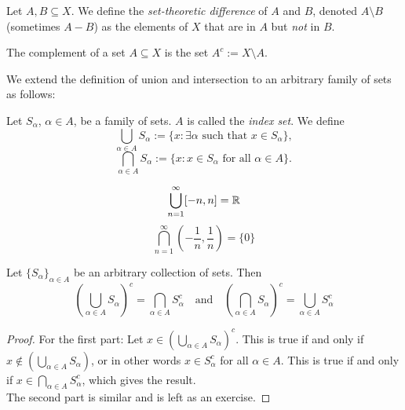 \documentclass{article}
\begin{document}
\begin{definition}
Let $A,B \subseteq X$. We define the \emph{set-theoretic difference} of $A$ and $B$, denoted $A \setminus B$ (sometimes $A-B$) as the elements of $X$ that are in $A$ but \emph{not} in $B$. 

The complement of a set $A \subseteq X$ is the set $A^c := X \setminus A$.
\end{definition}

We extend the definition of union and intersection to an arbitrary family of sets as follows:

\begin{definition}
Let $S_\alpha$, $\alpha \in A$, be a family of sets. $A$ is called the \emph{index set}. We define
\begin{equation*}
    \bigcup_{\alpha \in A} S_\alpha := \{ x: \exists \alpha \text{ such that } x \in S_\alpha \},
\end{equation*}
\begin{equation*}
    \bigcap_{\alpha \in A} S_\alpha := \{ x: x \in S_\alpha \text{ for all } \alpha \in A \}.
\end{equation*}
\end{definition}

\begin{example}
$$\bigcup_{n=1}^\infty [-n,n] = {\mathbb{R}}$$
$$\bigcap_{n=1}^\infty \left( -\frac{1}{n},\frac{1}{n} \right) = \{0 \}$$
\end{example}

\begin{theorem}
Let $\{S_\alpha\}_{\alpha \in A}$ be an arbitrary collection of sets. Then 
\begin{equation*}
    \left( \bigcup_{\alpha \in A} S_\alpha \right)^c = \bigcap_{\alpha \in A}  S_\alpha^c \quad \text{and} \quad \left( \bigcap_{\alpha \in A} S_\alpha \right)^c = \bigcup_{\alpha \in A}  S_\alpha^c
\end{equation*}
\end{theorem}

\begin{proof}
For the first part: Let $x \in \left( \bigcup_{\alpha \in A} S_\alpha \right)^c$. This is true if and only if $x \notin \left( \bigcup_{\alpha \in A} S_\alpha \right)$, or in other words $x \in S_\alpha^c$ for all $\alpha \in A$. This is true if and only if $x \in \bigcap_{\alpha \in A} S_\alpha^c$, which gives the result. \\
The second part is similar and is left as an exercise. 
\end{proof}
\end{document}

